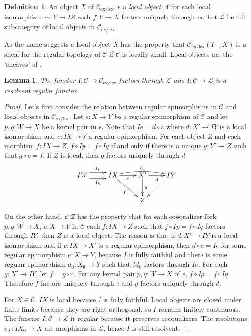 \documentclass[sort&compress]{elsarticle}
\theoremstyle{plain}
\newtheorem{lemma}[theorem]{Lemma}
\theoremstyle{definition}
\newtheorem{defin}[theorem]{Definition}
\theoremstyle{remark}
\newcommand\cat\mathcal
\newcommand\exlex{_\mathrm{ex/lex}}\newcommand\exreg{_\mathrm{ex/reg}}
\begin{document}
\begin{defin} An object $X$ of $\cat C\exlex$ is a \emph{local object}, if for each local isomorphism $m:Y\to IZ$ each $f:Y \to X$ factors uniquely through $m$. Let $\cat L$ be full subcategory of local objects in $\cat C\exlex$. \end{defin}

As the name suggests a local object $X$ has the property that $\cat C\exlex(I -,X)$ is a sheaf for the regular topology of $\cat C$ if $\cat C$ is locally small. Local objects are the `sheaves' of \citet{MR1870615}.

\begin{lemma} The functor $I:\cat C\to \cat C\exlex$ factors through $\cat L$ and $I:\cat C \to\cat L$ is a \emph{resolvent} regular functor.\label{iberegular} \end{lemma}

\begin{proof} Let's first consider the relation between regular epimorphisms in $\cat C$ and local objects in $\cat C\exlex$.
Let $e:X\to Y$ be a regular epimorphism of $\cat C$ and let $p,q:W\to X$ be a kernel pair in $e$. Note that $Ie = d\circ c$ where $d:X'\to IY$ is a local isomorphism and $c:IX\to Y$ a regular epimorphism. For each object $Z$ and each morphism $f:IX\to Z$, $f\circ Ip = f\circ Iq$ if and only if there is a unique $g:Y'\to Z$ such that $g\circ c= f$. If $Z$ is local, then $g$ factors uniquely through $d$.
\[\xymatrix{
IW \ar@<1ex>[r]^{Ip}\ar@<-1ex>[r]_{Iq} & IX \ar@/^/[rr]^{Ie}\ar[r]_{c}\ar[dr]_f & X'\ar[r]_d\ar[d]^g & IY\ar@{.>}[dl] \\
&& Z
}\]

On the other hand, if $Z$ has the property that for each coequalizer fork $p,q:W\to X$, $e:X\to Y$ in $\cat C$ each $f:IX\to Z$ such that $f\circ Ip=f\circ Iq$ factors through $IY$, then $Z$ is a local object. The reason is that if $d:X'\to IY$ is a local isomorphism and if $c:IX \to X'$ is a regular epimorphism, then $d\circ c = Ie$ for some regular epimorphism $e:X \to Y$, because $I$ is fully faithful and there is some regular epimorphism $d_0: X_0\to Y$ such that $Id_0$ factors through $Ie$. For each $g:X' \to IY$, let $f = g\circ c$. For any kernal pair $p,q:W\to X$ of $e$, $f\circ Ip = f\circ Iq$. Therefore $f$ factors uniquely through $e$ and $g$ factors uniquely through $d$.

For $X\in\cat C$, $IX$ is local because $I$ is fully faithful. Local objects are closed under finite limits because they are right orthogonal, so $I$ remains finitely continuous. The functor $I:\cat C\to\cat L$ it regular because it preserves coequalizers. The resolutions $c_X:IX_0 \to X$ are morphisms in $\cat L$, hence $I$ is still resolvent.
\end{proof}
\end{document}
